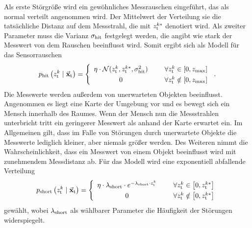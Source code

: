 Als erste Störgröße wird ein gewöhnliches Messrauschen eingeführt, das als normal verteilt angenommen wird. Der Mittelwert der Verteilung sie die tatsächliche Distanz auf dem Messstrahl, die mit $z^{k*}_{\text{t}}$ denotiert wird. Als zweiter Parameter muss die Varianz $\sigma_{\text{hit}}$ festgelegt werden, die angibt wie stark der Messwert von dem Rauschen beeinflusst wird. Somit ergibt sich als Modell für das Sensorrauschen
\begin{equation}
p\idx{hit}\left( z^{k}\idx{t} \mCond \mVec{x}\idx{t} \right) = \left\{ \begin{array}{cl}
\eta \cdot \mathcal{N}(z^k\idx{t}, z^{k*}\idx{t}, \sigma^2\idx{hit}) & \hspace{5mm}\forall z^k\idx{t} \in \left[0, z\idx{max}\right] \\
0 & \hspace{5mm} \forall z^k\idx{t} \notin \left[0, z\idx{max}\right]
\end{array}\right. \,.
\end{equation}
Die Messwerte werden außerdem von unerwarteten Objekten beeinflusst. Angenommen es liegt eine Karte der Umgebung vor und es bewegt sich ein Mensch innerhalb des Raumes. Wenn der Mensch nun die Messstrahlen unterbricht tritt ein geringerer Messwert als anhand der Karte erwartet ein. Im Allgemeinen gilt, dass im Falle von Störungen durch unerwartete Objekte die Messwerte lediglich kleiner, aber niemals größer werden. Des Weiteren nimmt die Wahrscheinlichkeit, dass ein Messwert von einem Objekt beeinflusst wird mit zunehmendem Messdistanz ab. Für das Modell wird eine exponentiell abfallende Verteilung
\begin{equation}
\renewcommand*{\arraystretch}{1.3}
p\idx{short}\left( z^k\idx{t} \mCond \mVec{x}\idx{t} \right) = \left\{ \begin{array}{cl}
\eta \cdot \lambda\idx{short}\cdot e^{-\lambda\idx{short}\cdot z^{k}\idx{t}} & \hspace{5mm} \forall z^{k}\idx{t} \in \left[0, z^{k*}\idx{t}\right] \\
0 & \hspace{5mm} \forall z^{k}\idx{t} \notin \left[0, z^{k*}\idx{t}\right]
\end{array}\right. 
\end{equation}
gewählt, wobei $\lambda_{\text{short}}$ als wählbarer Parameter die Häufigkeit der Störungen widerspiegelt.

